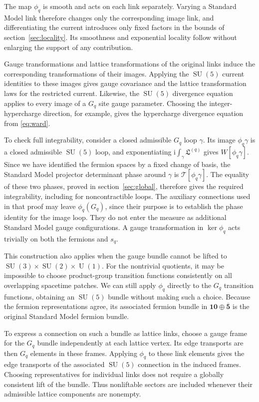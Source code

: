 \documentclass[11pt,a4paper]{article}
\theoremstyle{remark}
\DeclareMathOperator{\SU}{SU}
\DeclareMathOperator{\U}{U}
\newcommand{\ii}{\mathrm i}
\begin{document}
The map $\phi_q$ is smooth and acts on each link separately.
Varying a Standard Model link therefore changes only the corresponding
image link, and differentiating the current introduces only fixed factors
in the bounds of section~\ref{sec:locality}. Its smoothness and exponential
locality follow without enlarging the support of any contribution.

Gauge transformations and lattice transformations of the original links
induce the corresponding transformations of their images. Applying the
$\SU(5)$ current identities to these images gives gauge covariance and
the lattice transformation laws for the restricted current. Likewise,
the $\SU(5)$ divergence equation applies to every image of a $G_q$
site gauge parameter. Choosing the integer-hypercharge direction, for
example, gives the hypercharge divergence equation from \eqref{eq:ward}.

To check full integrability, consider a closed admissible $G_q$ loop
$\gamma$. Its image $\phi_q\gamma$ is a closed admissible $\SU(5)$
loop, and exponentiating $\ii\int_\gamma\mathfrak L^{(q)}$ gives
$W[\phi_q\gamma]$. Since we have identified the fermion spaces by a
fixed change of basis, the Standard Model projector determinant phase
around $\gamma$ is $\mathcal T[\phi_q\gamma]$. The equality of these
two phases, proved in section~\ref{sec:global}, therefore gives the
required integrability, including for noncontractible loops. The auxiliary
connections used in that proof may leave $\phi_q(G_q)$, since their
purpose is to establish the phase identity for the image loop. They do
not enter the measure as additional Standard Model gauge configurations.
A gauge transformation in $\ker\phi_q$ acts trivially on both the
fermions and $s_q$.

This construction also applies when the gauge bundle cannot be lifted
to $\SU(3)\times\SU(2)\times\U(1)$. For the nontrivial quotients,
it may be impossible to choose product-group transition functions
consistently on all overlapping spacetime patches. We can still apply
$\phi_q$ directly to the $G_q$ transition functions, obtaining an
$\SU(5)$ bundle without making such a choice. Because the fermion
representations agree, its associated fermion bundle in
$\mathbf{10}\oplus\bar{\mathbf5}$ is the original Standard Model
fermion bundle.

To express a connection on such a bundle as lattice links, choose a gauge
frame for the $G_q$ bundle independently at each lattice vertex. Its edge
transports are then $G_q$ elements in these frames. Applying $\phi_q$
to these link elements gives the edge transports of the associated
$\SU(5)$ connection in the induced frames.
Choosing representatives for individual links does not require a globally
consistent lift of the bundle. Thus nonliftable sectors are included
whenever their admissible lattice components are nonempty.
\end{document}
